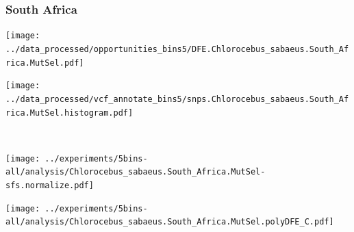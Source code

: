 \subsubsection{South Africa}

\begin{minipage}{0.49\linewidth}
    \texttt{[image: ../data\_processed/opportunities\_bins5/DFE.Chlorocebus\_sabaeus.South\_Africa.MutSel.pdf]}
\end{minipage}
\begin{minipage}{0.49\linewidth}
    \texttt{[image: ../data\_processed/vcf\_annotate\_bins5/snps.Chlorocebus\_sabaeus.South\_Africa.MutSel.histogram.pdf]}
\end{minipage}
\\
\begin{minipage}{0.49\linewidth}
    \texttt{[image: ../experiments/5bins-all/analysis/Chlorocebus\_sabaeus.South\_Africa.MutSel-sfs.normalize.pdf]}
\end{minipage}
\begin{minipage}{0.4\linewidth}
    \texttt{[image: ../experiments/5bins-all/analysis/Chlorocebus\_sabaeus.South\_Africa.MutSel.polyDFE\_C.pdf]}
\end{minipage}
